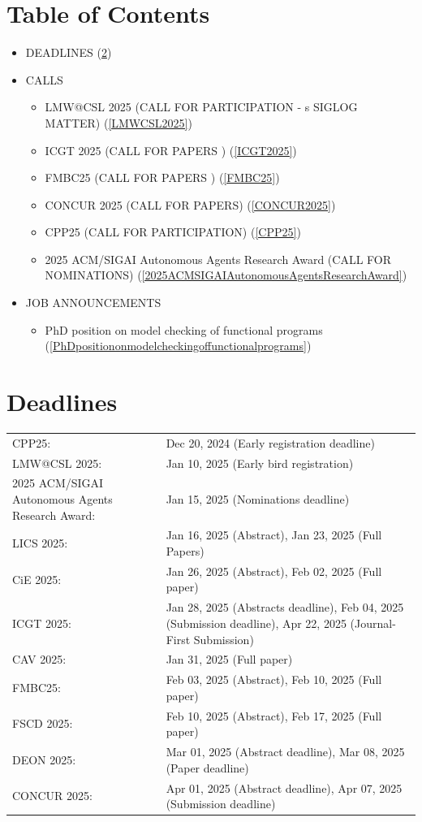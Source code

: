 \documentclass[prodmode,acmtecs]{acmsmall} %
\begin{document}
\section{Table of Contents}\begin{itemize}\item DEADLINES (\cref{deadlines}) 
 
\item CALLS 
 
\begin{itemize}\item LMW@CSL 2025 (CALL FOR PARTICIPATION - s SIGLOG MATTER) (\cref{LMWCSL2025})
\item ICGT 2025 (CALL FOR PAPERS ) (\cref{ICGT2025})
\item FMBC25 (CALL FOR PAPERS ) (\cref{FMBC25})
\item CONCUR 2025 (CALL FOR PAPERS) (\cref{CONCUR2025})
\item CPP25 (CALL FOR PARTICIPATION) (\cref{CPP25})
\item 2025 ACM/SIGAI Autonomous Agents Research Award (CALL FOR NOMINATIONS) (\cref{2025ACMSIGAIAutonomousAgentsResearchAward})
\end{itemize} 
\item JOB ANNOUNCEMENTS 
 
\begin{itemize}\item PhD position on model checking of functional programs (\cref{PhDpositiononmodelcheckingoffunctionalprograms})
\end{itemize} 
\end{itemize}\section{Deadlines}\label{deadlines}\begin{tabulary}{\linewidth}{LL}CPP25:  & Dec 20, 2024 (Early registration deadline) \\
LMW@CSL 2025:  & Jan 10, 2025 (Early bird registration) \\
2025 ACM/SIGAI Autonomous Agents Research Award:  & Jan 15, 2025 (Nominations deadline) \\
LICS 2025:  & Jan 16, 2025 (Abstract), Jan 23, 2025 (Full Papers) \\
CiE 2025:  & Jan 26, 2025 (Abstract), Feb 02, 2025 (Full paper) \\
ICGT 2025:  & Jan 28, 2025 (Abstracts deadline), Feb 04, 2025 (Submission deadline), Apr 22, 2025 (Journal-First Submission) \\
CAV 2025:  & Jan 31, 2025 (Full paper) \\
FMBC25:  & Feb 03, 2025 (Abstract), Feb 10, 2025 (Full paper) \\
FSCD 2025:  & Feb 10, 2025 (Abstract), Feb 17, 2025 (Full paper) \\
DEON 2025:  & Mar 01, 2025 (Abstract deadline), Mar 08, 2025 (Paper deadline) \\
CONCUR 2025:  & Apr 01, 2025 (Abstract  deadline), Apr 07, 2025 (Submission deadline) \\
\end{tabulary}
\end{document}
